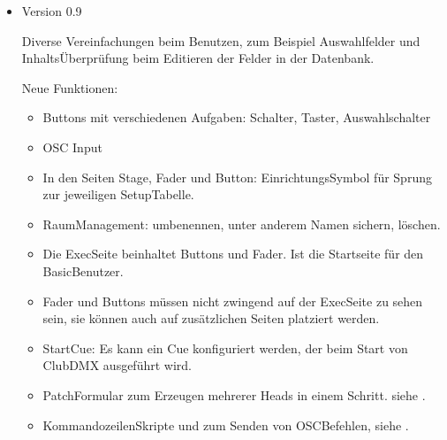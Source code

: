 \documentclass[letterpaper,10pt,ngerman]{sphinxmanual}
\begin{document}
\begin{itemize}
\begin{itemize}
\item {} 
Das Speichern des Topcue wird vereinfacht. Nun kann der Topcue
als Fader oder Button abgespeichert werden.

\item {} 
Die Raum\sphinxhyphen{}Sicherung wird erweitert um upload/download.

\end{itemize}

\item {} 
Version 0.9

Diverse Vereinfachungen beim Benutzen, zum Beispiel Auswahlfelder und
Inhalts\sphinxhyphen{}Überprüfung beim Editieren der Felder in der
Datenbank.

Neue Funktionen:
\begin{itemize}
\item {} 
Buttons mit verschiedenen Aufgaben: Schalter, Taster, Auswahlschalter

\item {} 
OSC Input

\item {} 
In den Seiten Stage, Fader und Button: Einrichtungs\sphinxhyphen{}Symbol für
Sprung zur jeweiligen Setup\sphinxhyphen{}Tabelle.

\item {} 
Raum\sphinxhyphen{}Management: umbenennen, unter anderem Namen sichern, löschen.

\item {} 
Die Exec\sphinxhyphen{}Seite beinhaltet Buttons und Fader. Ist die Startseite für den
Basic\sphinxhyphen{}Benutzer.

\item {} 
Fader und Buttons müssen nicht zwingend auf der Exec\sphinxhyphen{}Seite zu sehen sein,
sie können auch auf zusätzlichen Seiten platziert werden.

\item {} 
Start\sphinxhyphen{}Cue: Es kann ein Cue konfiguriert werden, der beim Start von
ClubDMX ausgeführt wird.

\item {} 
Patch\sphinxhyphen{}Formular zum Erzeugen mehrerer Heads in einem Schritt.
siehe {\hyperref[\detokenize{patch:neupatchlabel}]{}} .

\item {} 
Kommandozeilen\sphinxhyphen{}Skripte  und  zum Senden von
OSC\sphinxhyphen{}Befehlen, siehe {\hyperref[\detokenize{einrichten:crontab-label}]{}}.


\end{itemize}
\end{itemize}
\end{document}
